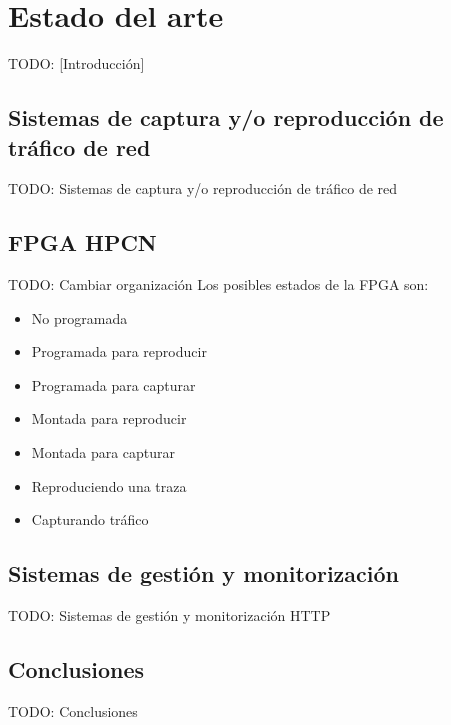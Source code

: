 \chapter{Estado del arte\label{cap:estadoDelArte}}

TODO: [Introducción]


\section{Sistemas de captura y/o reproducción de tráfico de red\label{sec:eda:sistemas_captura_reproducccion}}

TODO: Sistemas de captura y/o reproducción de tráfico de red

\section{FPGA HPCN\label{ssec:eda:fpga}}
TODO: Cambiar organización
Los posibles estados de la \gls{FPGA} son:
\begin{itemize}\label{fpga:estados}
  \item No programada
  \item Programada para reproducir
  \item Programada para capturar
  \item Montada para reproducir
  \item Montada para capturar
  \item Reproduciendo una \gls{traza}
  \item Capturando tráfico
\end{itemize}

\section{Sistemas de gestión y monitorización\label{sec:eda:sistemas_gestion_monitorizacion}}

TODO: Sistemas de gestión y monitorización
\gls{HTTP}


\section{Conclusiones\label{sec:eda:conclusiones}}

TODO: Conclusiones